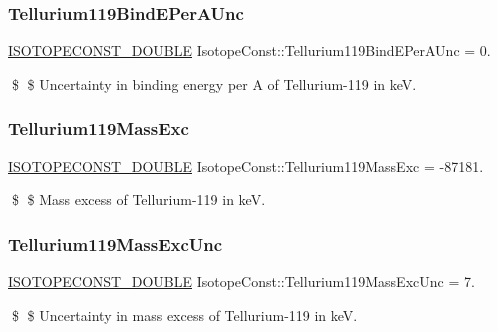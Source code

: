\subsubsection{\texorpdfstring{Tellurium119\+Bind\+E\+Per\+A\+Unc}{Tellurium119BindEPerAUnc}}
{\footnotesize\ttfamily \mbox{\hyperlink{group___isotope_const-_macros_ga8f45a7272ce02c0b4c65c44636ed719a}{I\+S\+O\+T\+O\+P\+E\+C\+O\+N\+S\+T\+\_\+\+D\+O\+U\+B\+LE}} Isotope\+Const\+::\+Tellurium119\+Bind\+E\+Per\+A\+Unc = 0.}

\$ \$ Uncertainty in binding energy per A of Tellurium-\/119 in keV. \mbox{\label{group___isotope_const-_tellurium-_te119_ga8c2215159b36a36ab044cad06dcd14d3}} 
\subsubsection{\texorpdfstring{Tellurium119\+Mass\+Exc}{Tellurium119MassExc}}
{\footnotesize\ttfamily \mbox{\hyperlink{group___isotope_const-_macros_ga8f45a7272ce02c0b4c65c44636ed719a}{I\+S\+O\+T\+O\+P\+E\+C\+O\+N\+S\+T\+\_\+\+D\+O\+U\+B\+LE}} Isotope\+Const\+::\+Tellurium119\+Mass\+Exc = -\/87181.}

\$ \$ Mass excess of Tellurium-\/119 in keV. \mbox{\label{group___isotope_const-_tellurium-_te119_ga58fc0390ea75db2b1757c4af659f2e33}} 
\subsubsection{\texorpdfstring{Tellurium119\+Mass\+Exc\+Unc}{Tellurium119MassExcUnc}}
{\footnotesize\ttfamily \mbox{\hyperlink{group___isotope_const-_macros_ga8f45a7272ce02c0b4c65c44636ed719a}{I\+S\+O\+T\+O\+P\+E\+C\+O\+N\+S\+T\+\_\+\+D\+O\+U\+B\+LE}} Isotope\+Const\+::\+Tellurium119\+Mass\+Exc\+Unc = 7.}

\$ \$ Uncertainty in mass excess of Tellurium-\/119 in keV. \mbox{\label{group___isotope_const-_tellurium-_te119_gadd30f89a57d69c27a9305283d0cadbad}} 
